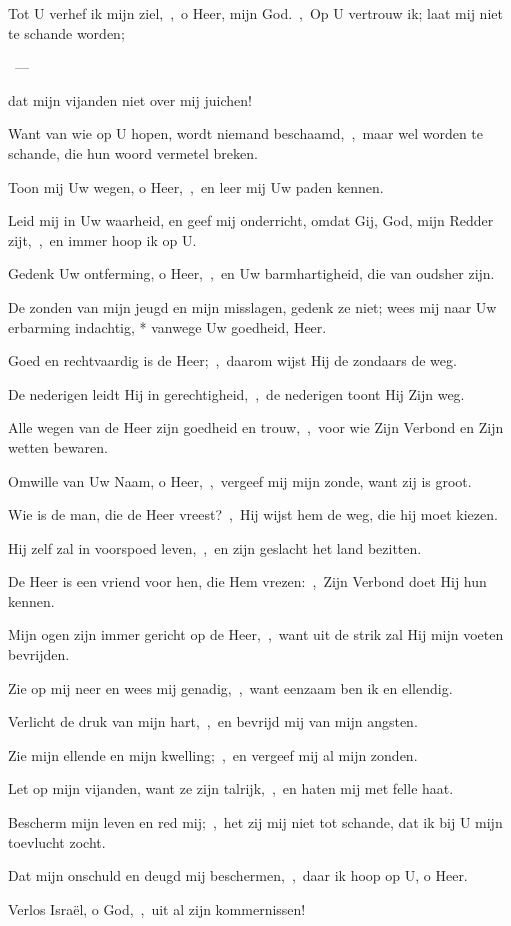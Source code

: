 \documentclass[12pt,twoside,a5paper]{article}
\begin{document}
\begin{halfparskip}
   
\end{halfparskip}

\begin{halfparskip}
   Tot U verhef ik mijn ziel,~\sep\ o Heer, mijn God.~\sep\ Op U vertrouw ik; laat mij niet te schande worden;

  ~--- 

  dat mijn vijanden niet over mij juichen!

  Want van wie op U hopen, wordt niemand beschaamd,~\sep\ maar wel worden te schande, die hun woord vermetel breken.

  Toon mij Uw wegen, o Heer,~\sep\ en leer mij Uw paden kennen.

  Leid mij in Uw waarheid, en geef mij onderricht, omdat Gij, God, mijn Redder zijt,~\sep\ en immer hoop ik op U.

  Gedenk Uw ontferming, o Heer,~\sep\ en Uw barmhartigheid, die van oudsher zijn.

  De zonden van mijn jeugd en mijn misslagen, gedenk ze niet; wees mij naar Uw erbarming indachtig, *
  vanwege Uw goedheid, Heer.

  Goed en rechtvaardig is de Heer;~\sep\ daarom wijst Hij de zondaars de weg.

  De nederigen leidt Hij in gerechtigheid,~\sep\ de nederigen toont Hij Zijn weg.

  Alle wegen van de Heer zijn goedheid en trouw,~\sep\ voor wie Zijn Verbond en Zijn wetten bewaren.

  Omwille van Uw Naam, o Heer,~\sep\ vergeef mij mijn zonde, want zij is groot.

  Wie is de man, die de Heer vreest?~\sep\ Hij wijst hem de weg, die hij moet kiezen.

  Hij zelf zal in voorspoed leven,~\sep\ en zijn geslacht het land bezitten.

  De Heer is een vriend voor hen, die Hem vrezen:~\sep\ Zijn Verbond doet Hij hun kennen.

  Mijn ogen zijn immer gericht op de Heer,~\sep\ want uit de strik zal Hij mijn voeten bevrijden.

  Zie op mij neer en wees mij genadig,~\sep\ want eenzaam ben ik en ellendig.

  Verlicht de druk van mijn hart,~\sep\ en bevrijd mij van mijn angsten.

  Zie mijn ellende en mijn kwelling;~\sep\ en vergeef mij al mijn zonden.

  Let op mijn vijanden, want ze zijn talrijk,~\sep\ en haten mij met felle haat.

  Bescherm mijn leven en red mij;~\sep\ het zij mij niet tot schande, dat ik bij U mijn toevlucht zocht.

  Dat mijn onschuld en deugd mij beschermen,~\sep\ daar ik hoop op U, o Heer.

  Verlos Israël, o God,~\sep\ uit al zijn kommernissen!
\end{halfparskip}
\end{document}
